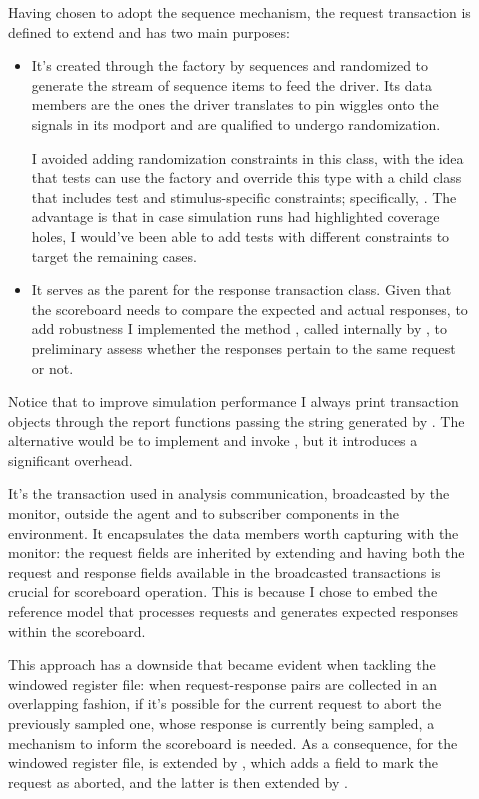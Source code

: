 \begin{description}
    \item[] Having chosen to adopt the sequence mechanism, the request transaction is defined to extend  and has two main purposes:
    \begin{itemize}
        \item It's created through the factory by sequences and randomized to generate the stream of sequence items to feed the driver. Its data members are the ones the driver translates to pin wiggles onto the signals in its modport and are qualified to undergo randomization. 
        
        I avoided adding randomization constraints in this class, with the idea that tests can use the factory and override this type with a child class that includes test and stimulus-specific constraints; specifically, . The advantage is that in case simulation runs had highlighted coverage holes, I would've been able to add tests with different constraints to target the remaining cases.

        \item It serves as the parent for the response transaction class. Given that the scoreboard needs to compare the expected and actual \dut responses, to add robustness I implemented the method , called internally by , to preliminary assess whether the responses pertain to the same request or not.
    \end{itemize}
    Notice that to improve simulation performance I always print transaction objects through the \uvm report functions passing the string generated by . The alternative would be to implement  and invoke , but it introduces a significant overhead.
    
    \item[] It's the transaction used in analysis communication, broadcasted by the monitor, outside the agent and to subscriber components in the environment. It encapsulates the data members worth capturing with the monitor: the request fields are inherited by extending  and having both the request and response fields available in the broadcasted transactions is crucial for scoreboard operation. This is because I chose to embed the reference model that processes requests and generates expected responses within the scoreboard.

    This approach has a downside that became evident when tackling the windowed register file: when request-response pairs are collected in an overlapping fashion, if it's possible for the current request to abort the previously sampled one, whose response is currently being sampled, a mechanism to inform the scoreboard is needed. As a consequence, for the windowed register file,  is extended by , which adds a field to mark the request as aborted, and the latter is then extended by .
\end{description}


